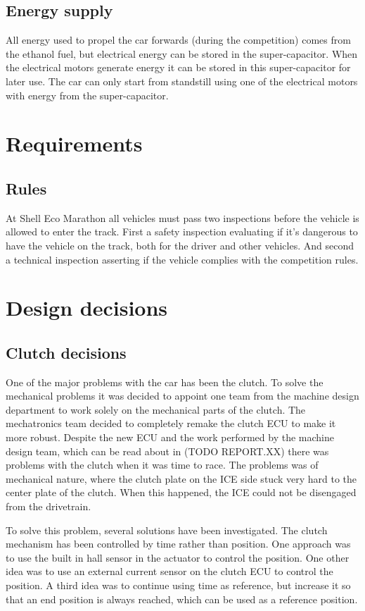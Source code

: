 \subsection{Energy supply}
All energy used to propel the car forwards (during the competition) comes from the ethanol fuel, but electrical energy can be stored in the super-capacitor. When the electrical motors generate energy it can be stored in this super-capacitor for later use. The car can only start from standstill using one of the electrical motors with energy from the super-capacitor.  

\section{Requirements}
\subsection{Rules}
At Shell Eco Marathon all vehicles must pass two inspections before the vehicle is allowed to enter the track. First a safety inspection evaluating if it's dangerous to have the vehicle on the track, both for the driver and other vehicles. And second a technical inspection asserting if the vehicle complies with the competition rules.

\section{Design decisions}
\subsection{Clutch decisions}
One of the major problems with the car has been the clutch. To solve the mechanical problems it was decided to appoint one team from the machine design department to work solely on the mechanical parts of the clutch. The mechatronics team decided to completely remake the clutch ECU to make it more robust. Despite the new ECU and the work performed by the machine design team, which can be read about in (TODO REPORT.XX) there was problems with the clutch when it was time to race. The problems was of mechanical nature, where the clutch plate on the ICE side stuck very hard to the center plate of the clutch. When this happened, the ICE  could not be disengaged from the drivetrain. 

To solve this problem, several solutions have been investigated. The clutch mechanism has been controlled by time rather than position. One approach was to use the built in hall sensor in the actuator to control the position. One other idea was to use an external current sensor on the clutch ECU to control the position. A third idea was to continue using time as reference, but increase it so that an end position is always reached, which can be used as a reference position.


